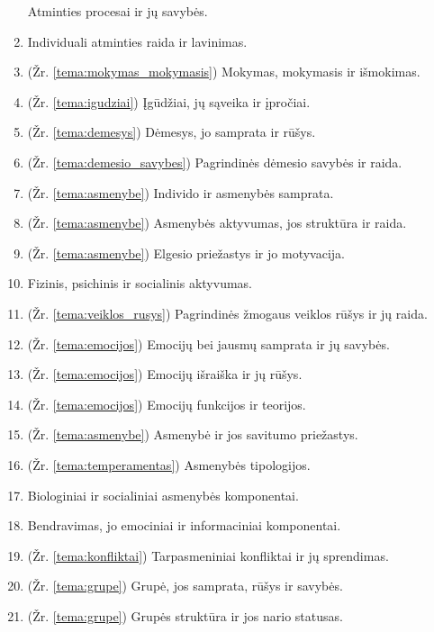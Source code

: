 \begin{enumerate}
    Atminties procesai ir jų savybės.
  \item \label{tema_23} Individuali atminties raida ir lavinimas.
  \item \label{tema_24} (Žr. \ref{tema:mokymas_mokymasis})
  Mokymas, mokymasis ir išmokimas.
  \item \label{tema_25} (Žr. \ref{tema:igudziai})
  Įgūdžiai, jų sąveika ir įpročiai.
  \item \label{tema_26} (Žr. \ref{tema:demesys})
    Dėmesys, jo samprata ir rūšys.
  \item \label{tema_27} (Žr. \ref{tema:demesio_savybes})
    Pagrindinės dėmesio savybės ir raida.
  \item \label{tema_30} (Žr. \ref{tema:asmenybe})
  Individo ir asmenybės samprata.
  \item \label{tema_31} (Žr. \ref{tema:asmenybe}) 
  Asmenybės aktyvumas, jos struktūra ir raida.
  \item \label{tema_32} (Žr. \ref{tema:asmenybe})
  Elgesio priežastys ir jo motyvacija.
  \item \label{tema_33} Fizinis, psichinis ir socialinis aktyvumas.
  \item \label{tema_34} (Žr. \ref{tema:veiklos_rusys})
  Pagrindinės žmogaus veiklos rūšys ir jų raida.
  \item \label{tema_35} (Žr. \ref{tema:emocijos})
  Emocijų bei jausmų samprata ir jų savybės.
  \item \label{tema_36} (Žr. \ref{tema:emocijos})
  Emocijų išraiška ir jų rūšys.
  \item \label{tema_37} (Žr. \ref{tema:emocijos})
  Emocijų funkcijos ir teorijos.
  \item \label{tema_40} (Žr. \ref{tema:asmenybe})
  Asmenybė ir jos savitumo priežastys.
  \item \label{tema_41} (Žr. \ref{tema:temperamentas})
  Asmenybės tipologijos.
  \item \label{tema_42} Biologiniai ir socialiniai asmenybės komponentai.
  \item \label{tema_43} Bendravimas, jo emociniai ir 
    informaciniai komponentai.
  \item \label{tema_44} (Žr. \ref{tema:konfliktai})
  Tarpasmeniniai konfliktai ir jų sprendimas.
  \item \label{tema_45} (Žr. \ref{tema:grupe})
  Grupė, jos samprata, rūšys ir savybės.
  \item \label{tema_46} (Žr. \ref{tema:grupe})
  Grupės struktūra ir jos nario statusas.
\end{enumerate}
